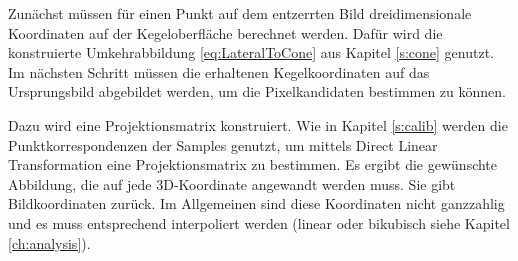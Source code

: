 Zunächst müssen für einen Punkt auf dem entzerrten Bild dreidimensionale Koordinaten auf der Kegeloberfläche berechnet werden. Dafür wird die konstruierte Umkehrabbildung \ref{eq:LateralToCone} aus Kapitel \ref{s:cone} genutzt. Im nächsten Schritt müssen die erhaltenen Kegelkoordinaten auf das Ursprungsbild abgebildet werden, um die Pixelkandidaten bestimmen zu können.

Dazu wird eine Projektionsmatrix konstruiert. Wie in Kapitel \ref{s:calib} werden die  Punktkorrespondenzen der Samples genutzt, um mittels Direct Linear Transformation eine Projektionsmatrix zu bestimmen.
Es ergibt die gewünschte Abbildung, die auf jede 3D-Koordinate angewandt werden muss. Sie gibt Bildkoordinaten zurück. Im Allgemeinen sind diese Koordinaten nicht ganzzahlig und es muss entsprechend interpoliert werden (linear oder bikubisch siehe Kapitel \ref{ch:analysis}).

